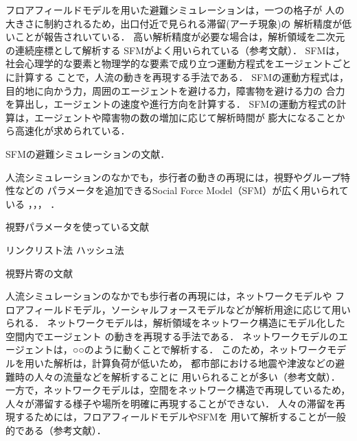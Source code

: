 フロアフィールドモデルを用いた避難シミュレーションは，一つの格子が
人の大きさに制約されるため，出口付近で見られる滞留(アーチ現象)の
解析精度が低いことが報告されいている．
高い解析精度が必要な場合は，解析領域を二次元の連続座標として解析する
SFMがよく用いられている（参考文献）．
SFMは，社会心理学的な要素と物理学的な要素で成り立つ運動方程式をエージェントごとに計算する
ことで，人流の動きを再現する手法である\cite{helbing_sfm}．
SFMの運動方程式は，目的地に向かう力，周囲のエージェントを避ける力，障害物を避ける力の
合力を算出し，エージェントの速度や進行方向を計算する．
SFMの運動方程式の計算は，エージェントや障害物の数の増加に応じて解析時間が
膨大になることから高速化が求められている．


SFMの避難シミュレーションの文献\cite{sfm_hinan1}\cite{sfm_hinan2}\cite{sfm_hinan3}．

人流シミュレーションのなかでも，歩行者の動きの再現には，視野やグループ特性などの
パラメータを追加できるSocial Force Model（SFM）が広く用いられている
\cite{helbing_sfm}，\cite{sfm_ntt}，\cite{sfm_para1}，\cite{intro_gunshu}
．

視野パラメータを使っている文献\cite{siya_ex2}\cite{siya_ex3}\cite{siya_ex4}\cite{siya_ex5}\cite{siya_ex6}\cite{siya_ex7}



リンクリスト法\cite{cell_book1}\cite{cell_book}\cite{cellrenketu}
ハッシュ法\cite{hash}

視野片寄の文献\cite{katayose}


人流シミュレーションのなかでも歩行者の再現には，ネットワークモデルや
フロアフィールドモデル，ソーシャルフォースモデルなどが解析用途に応じて用いられる．
ネットワークモデルは，解析領域をネットワーク構造にモデル化した空間内でエージェント
の動きを再現する手法である．
ネットワークモデルのエージェントは，○○のように動くことで解析する．
このため，ネットワークモデルを用いた解析は，計算負荷が低いため，
都市部における地震や津波などの避難時の人々の流量などを解析することに
用いられることが多い（参考文献）．
一方で，ネットワークモデルは，空間をネットワーク構造で再現しているため，
人々が滞留する様子や場所を明確に再現することができない．
人々の滞留を再現するためには，フロアフィールドモデルやSFMを
用いて解析することが一般的である（参考文献）．



